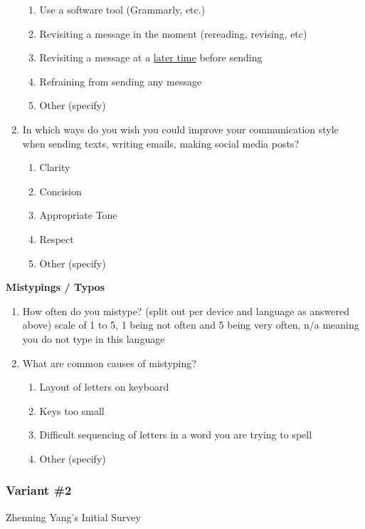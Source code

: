 \documentclass[acmsmall,screen,authorversion,nonacm]{acmart}
\begin{document}
\begin{enumerate}
\begin{enumerate}
      \item Use a software tool (Grammarly, etc.)
      \item Revisiting a message in the moment (rereading, revising, etc)
      \item Revisiting a message at a \underline{later time} before sending
      \item Refraining from sending any message
      \item Other (specify)
  \end{enumerate}
  \item In which ways do you wish you could improve your communication style when sending texts, writing emails, making social media posts?
  \begin{enumerate}
      \item Clarity
      \item Concision
      \item Appropriate Tone
      \item Respect
      \item Other (specify)
  \end{enumerate}

\end{enumerate}

\textbf{Mistypings / Typos}
\begin{enumerate}
    \item How often do you mistype? (split out per device and language as answered above) scale of 1 to 5, 1 being not often and 5 being very often, n/a meaning you do not type in this language
    \item What are common causes of mistyping?
    \begin{enumerate}
        \item Layout of letters on keyboard
        \item Keys too small
        \item Difficult sequencing of letters in a word you are trying to spell
        \item Other (specify)
    \end{enumerate}
\end{enumerate}


\subsubsection{Variant \#2}
\label{var2}

Zhenning Yang's Initial Survey
\end{document}
